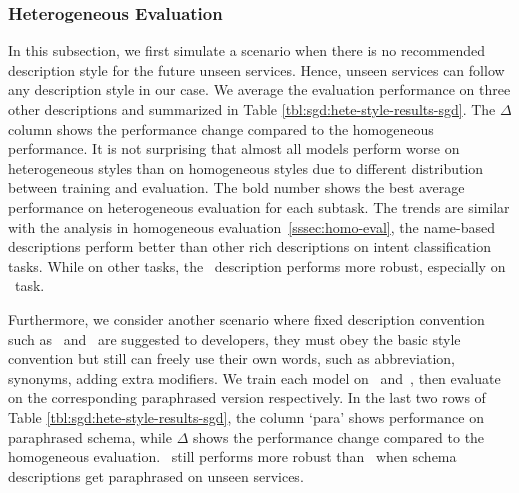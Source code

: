 \subsubsection{Heterogeneous Evaluation}
\label{sssec:heter-eval}
In this subsection, we first simulate a scenario when there is no
recommended description style for the future unseen services. Hence,
unseen services can follow any description style in our case. We
average the evaluation performance on three other descriptions and
summarized in Table \ref{tbl:sgd:hete-style-results-sgd}. The $\Delta$ column
shows the performance change compared to the homogeneous
performance. It is not surprising that almost all models perform worse
on heterogeneous styles than on homogeneous styles due to different
distribution between training and evaluation. The bold number shows
the best average performance on heterogeneous evaluation for each
subtask. The trends are similar with the analysis in homogeneous
evaluation~\ref{sssec:homo-eval}, the name-based descriptions perform
better than other rich descriptions on intent classification
tasks. While on other tasks, the \ORIGIN~description performs more
robust, especially on \NSL~task.

Furthermore, we consider another scenario where fixed description
convention such as \NAMEONLY~and \ORIGIN~are suggested to developers,
they must obey the basic style convention but still can freely use
their own words, such as abbreviation, synonyms, adding extra
modifiers. We train each model on \NAMEONLY~and~\ORIGIN, then evaluate
on the corresponding paraphrased version respectively. In the last two
rows of Table \ref{tbl:sgd:hete-style-results-sgd}, the column `para'
shows performance on paraphrased schema, while $\Delta$ shows the
performance change compared to the homogeneous evaluation.
\ORIGIN~still performs more robust than \NAMEONLY~when schema
descriptions get paraphrased on unseen services.

